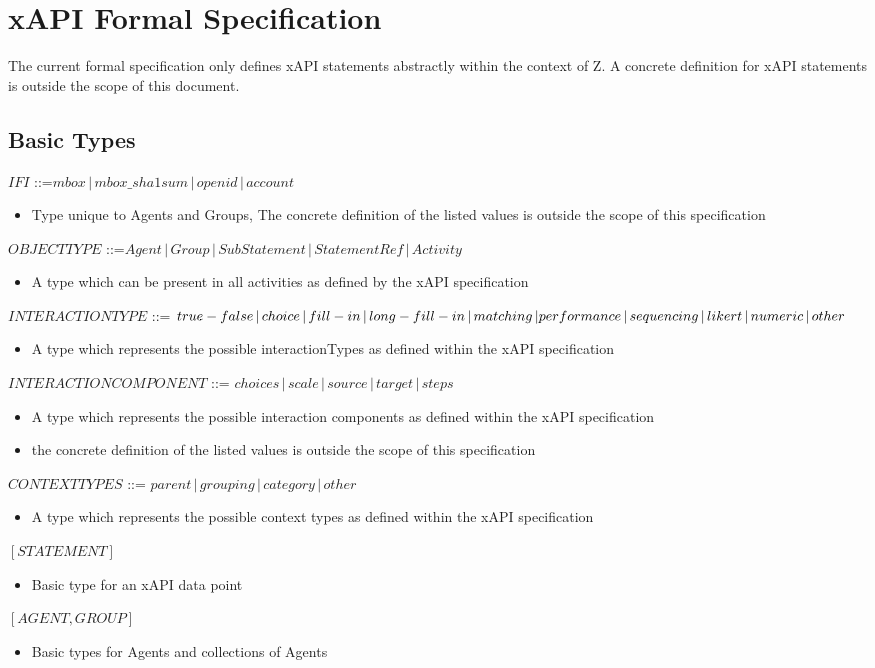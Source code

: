 \documentclass{article}
\begin{document}
\section{xAPI Formal Specification}
The current formal specification only defines xAPI statements
abstractly within the context of Z. A concrete definition for xAPI
statements is outside the scope of this document.

\subsection{Basic Types}
$IFI$ ::=$ mbox \,|\, mbox\_sha1sum \,|\, openid \,|\, account$
\begin{itemize}
\item Type unique to Agents and Groups, The concrete definition of the listed values
  is outside the scope of this specification
\end{itemize}
$OBJECTTYPE$ ::=$ Agent \,|\, Group \,|\, SubStatement \,|\,
StatementRef \,|\, Activity$
\begin{itemize}
\item A type which can be present in all activities as defined by
  the xAPI specification
\end{itemize}
$INTERACTIONTYPE$ ::= $true-false \,|\, choice \,|\, fill-in \,|\,
long-fill-in \,|\, matching \,| \\ performance \,|\, sequencing \,|\,
likert \,|\, numeric \,|\, other$
\begin{itemize}
\item A type which represents the possible interactionTypes as
  defined within the xAPI specification
\end{itemize}
$INTERACTIONCOMPONENT$ ::= $choices \,|\, scale \,|\, source \,|\,
target \,|\, steps$
\begin{itemize}
\item A type which represents the possible interaction components as
  defined within the xAPI specification
\item the concrete definition of the listed values is outside the
  scope of this specification
\end{itemize}
$CONTEXTTYPES$ ::= $parent \,|\, grouping \,|\, category \,|\, other$
\begin{itemize}
\item A type which represents the possible context types as
  defined within the xAPI specification
\end{itemize}
$[STATEMENT]$
\begin{itemize}
\item Basic type for an xAPI data point
\end{itemize}
$[AGENT, GROUP]$
\begin{itemize}
\item Basic types for Agents and collections of Agents
\end{itemize}
\end{document}
